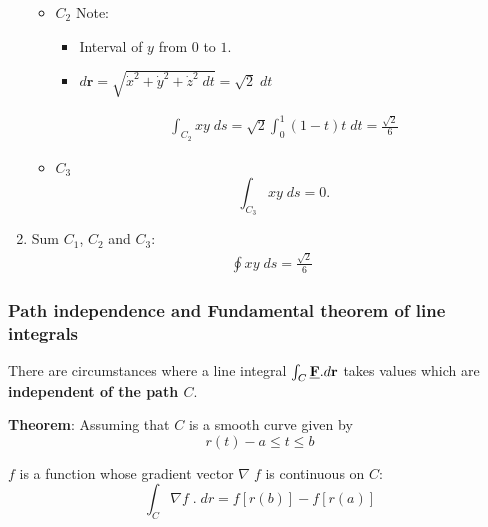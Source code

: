 \documentclass[10pt,a4paper]{article}
\begin{document}
\begin{enumerate}
\begin{itemize}
        \item $C_2$
        Note:
        \begin{itemize}
            \item Interval of $y$ from $0$ to $1$.
            \item $d\textbf{r} = \sqrt{\dot{x}^2 + \dot{y}^2 + \dot{z}^2\; dt} = \sqrt{2}\; dt$
        \end{itemize}
        \begin{align*}
            \int_{C_2}xy \; ds= \sqrt{2}\int_0^1 (1-t)t\; dt = \frac{\sqrt{2}}{6}
        \end{align*}
        \item $C_3$
        $$
        \int_{C_3}xy \; ds= 0.
        $$
    \end{itemize}
    \item Sum $C_1$, $C_2$ and $C_3$:
    \begin{align*}
        \oint xy \; ds = \frac{\sqrt{2}}{6}
    \end{align*}
\end{enumerate}

\subsubsection{Path independence and Fundamental theorem of line integrals}

There are circumstances where a line integral $\int_C \textbf{\underline{F}}.d \textbf{r}$ takes
values which are \textbf{independent of the path $C$}.

\begin{tcolorbox}[breakable,colback=white]
\textbf{Theorem}: Assuming that $C$ is a smooth curve given by $$r(t) - a\leq t \leq b$$

$f$ is a function whose gradient vector $\nabla\;f$ is continuous on $C$:
$$
    \int_C \nabla f\;.\;dr = f[r(b)]-f[r(a)]
$$
\end{tcolorbox}
\end{document}
